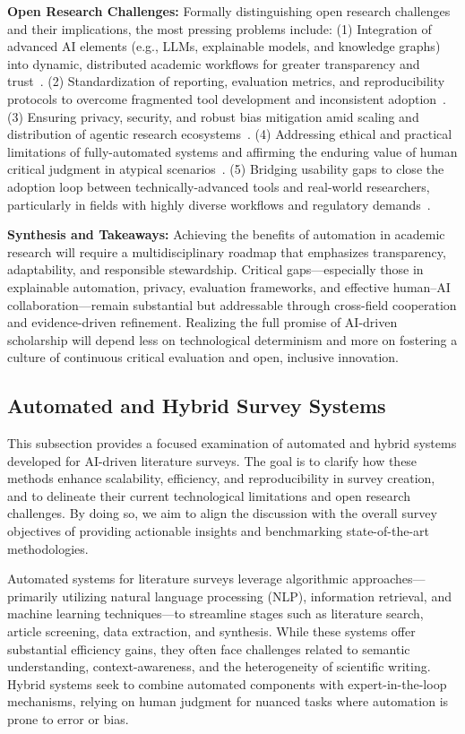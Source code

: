 \documentclass[sigconf]{acmart}
\begin{document}
\textbf{Open Research Challenges:}
Formally distinguishing open research challenges and their implications, the most pressing problems include: (1) Integration of advanced AI elements (e.g., LLMs, explainable models, and knowledge graphs) into dynamic, distributed academic workflows for greater transparency and trust~\cite{ref64,ref80}. (2) Standardization of reporting, evaluation metrics, and reproducibility protocols to overcome fragmented tool development and inconsistent adoption~\cite{ref28,ref31,ref80}. (3) Ensuring privacy, security, and robust bias mitigation amid scaling and distribution of agentic research ecosystems~\cite{ref80,ref102,ref112,ref113}. (4) Addressing ethical and practical limitations of fully-automated systems and affirming the enduring value of human critical judgment in atypical scenarios~\cite{ref51,ref96,ref97}. (5) Bridging usability gaps to close the adoption loop between technically-advanced tools and real-world researchers, particularly in fields with highly diverse workflows and regulatory demands~\cite{ref31,ref80}.

\textbf{Synthesis and Takeaways:} 
Achieving the benefits of automation in academic research will require a multidisciplinary roadmap that emphasizes transparency, adaptability, and responsible stewardship. Critical gaps—especially those in explainable automation, privacy, evaluation frameworks, and effective human–AI collaboration—remain substantial but addressable through cross-field cooperation and evidence-driven refinement. Realizing the full promise of AI-driven scholarship will depend less on technological determinism and more on fostering a culture of continuous critical evaluation and open, inclusive innovation.

\subsection{Automated and Hybrid Survey Systems}
This subsection provides a focused examination of automated and hybrid systems developed for AI-driven literature surveys. The goal is to clarify how these methods enhance scalability, efficiency, and reproducibility in survey creation, and to delineate their current technological limitations and open research challenges. By doing so, we aim to align the discussion with the overall survey objectives of providing actionable insights and benchmarking state-of-the-art methodologies.

Automated systems for literature surveys leverage algorithmic approaches—primarily utilizing natural language processing (NLP), information retrieval, and machine learning techniques—to streamline stages such as literature search, article screening, data extraction, and synthesis. While these systems offer substantial efficiency gains, they often face challenges related to semantic understanding, context-awareness, and the heterogeneity of scientific writing. Hybrid systems seek to combine automated components with expert-in-the-loop mechanisms, relying on human judgment for nuanced tasks where automation is prone to error or bias.
\end{document}
